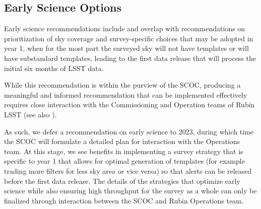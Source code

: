 \subsection{Early Science Options}\label{q:Early}
Early science recommendations include and overlap with recommendations on prioritization of sky coverage and survey-specific choices that may be adopted in year 1, when for the most part the surveyed sky will not have templates or will have substandard templates, leading to the first data release that will process the initial six months of LSST data. 

While this recommendation is within the purview of the SCOC, producing a meaningful and informed recommendation that can be implemented effectively requires close interaction with the Commissioning and Operation teams of Rubin LSST (see also \citealt{rtn-011}).

As such, we defer a  recommendation on early science to 2023, during which time the SCOC will formulate a detailed plan for interaction with the Operations team. At this stage, we see benefits in implementing a survey strategy that is specific to year 1 that allows for optimal generation of templates (for example trading more filters for less sky area or vice versa) so that alerts can be released before the first data release. The details of the strategies that optimize early science while also ensuring high throughput for the survey as a whole can only be finalized through interaction between the SCOC and Rubin Operations team. 
